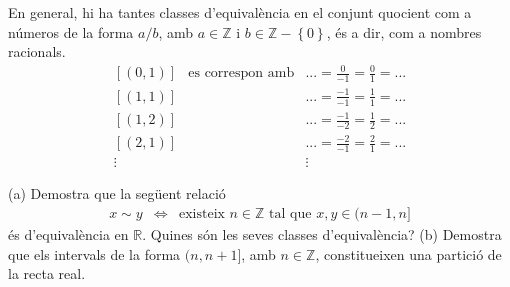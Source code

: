 \begin{solucio}
En general, hi ha tantes classes d'equival\`{e}ncia en el conjunt quocient
com a n\'{u}meros de la forma $a/b$, amb $a\in \mathbb{Z}$ i $b\in \mathbb{Z}%
-\left\{ 0\right\} $, \'{e}s a dir, com a nombres racionals.%
\begin{equation*}
\begin{array}{ccc}
\left[ (0,1)\right] & \text{es correspon amb} & ...=\frac{0}{-1}=\frac{0}{1}%
=... \\
\left[ (1,1)\right] &  & ...=\frac{-1}{-1}=\frac{1}{1}=... \\
\left[ (1,2)\right] &  & ...=\frac{-1}{-2}=\frac{1}{2}=... \\
\left[ (2,1)\right] &  & ...=\frac{-2}{-1}=\frac{2}{1}=... \\
\vdots &  & \vdots%
\end{array}%
\end{equation*}
\end{solucio}

\begin{exer}
(a) Demostra que la seg\"{u}ent relaci\'{o}%
\begin{equation*}
\begin{array}{ccc}
x\sim y & \Longleftrightarrow & \text{existeix }n\in \mathbb{Z}\text{ \ tal
que }x,y\in (n-1,n]%
\end{array}%
\end{equation*}%
\'{e}s d'equival\`{e}ncia en $\mathbb{R}$. Quines s\'{o}n les seves classes
d'equival\`{e}ncia? (b) Demostra que els intervals de la forma $(n,n+1]$,
amb $n\in \mathbb{Z}$, constitueixen una partici\'{o} de la recta real.
\end{exer}


